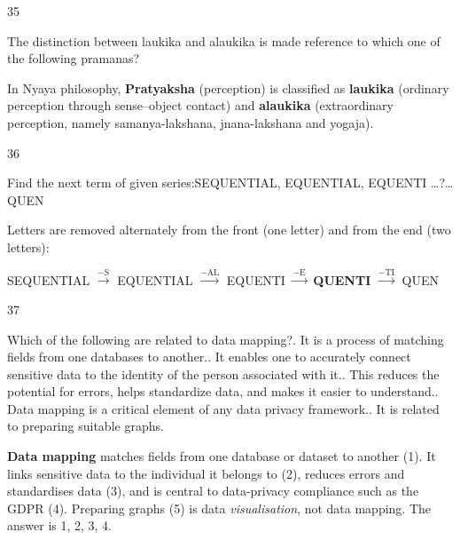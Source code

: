 \begin{question}{35}
{The distinction between laukika and alaukika is made reference to which one of the following pramanas?\par}
\begin{explain}
In Nyaya philosophy, \textbf{Pratyaksha} (perception) is classified as \textbf{laukika} (ordinary perception through sense--object contact) and \textbf{alaukika} (extraordinary perception, namely samanya-lakshana, jnana-lakshana and yogaja).
\end{explain}
\end{question}

\begin{question}{36}
{Find the next term of given series:\newline SEQUENTIAL, EQUENTIAL, EQUENTI \ldots{}?\ldots{} QUEN\par}
\begin{explain}
Letters are removed alternately from the front (one letter) and from the end (two letters):
\begin{center}
SEQUENTIAL $\xrightarrow{-\text{S}}$ EQUENTIAL $\xrightarrow{-\text{AL}}$ EQUENTI $\xrightarrow{-\text{E}}$ \textbf{QUENTI} $\xrightarrow{-\text{TI}}$ QUEN
\end{center}
\end{explain}
\end{question}

\begin{question}{37}
{Which of the following are related to data mapping?. It is a process of matching fields from one databases to another.. It enables one to accurately connect sensitive data to the identity of the person associated with it.. This reduces the potential for errors, helps standardize data, and makes it easier to understand.. Data mapping is a critical element of any data privacy framework.. It is related to preparing suitable graphs.\par}
\begin{explain}
\textbf{Data mapping} matches fields from one database or dataset to another (1). It links sensitive data to the individual it belongs to (2), reduces errors and standardises data (3), and is central to data-privacy compliance such as the GDPR (4). Preparing graphs (5) is data \emph{visualisation}, not data mapping. The answer is 1, 2, 3, 4.
\end{explain}
\end{question}

